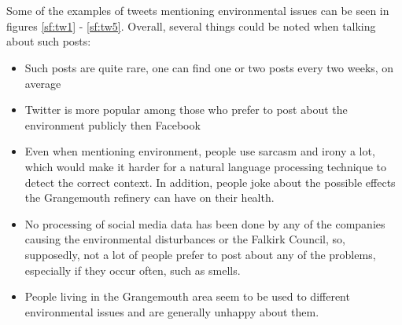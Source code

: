 \begin{figure}[t!]
\begin{minipage}{10cm}
 \end{minipage}
 \\ \vspace{0.1cm}
 \begin{minipage}{10cm}
     \centering
 \end{minipage}
 \\ \vspace{0.1cm}
 \begin{minipage}{10cm}
     \centering
 \end{minipage}
 \label{fig:multifigtweets}
 \end{figure}
 
 Some of the examples of tweets mentioning environmental issues can be seen in figures \ref{sf:tw1} - \ref{sf:tw5}. Overall, several things could be noted when talking about such posts:
 \begin{itemize}
     \item Such posts are quite rare, one can find one or two posts every two weeks, on average
     \item Twitter is more popular among those who prefer to post about the environment publicly then Facebook
     \item Even when mentioning environment, people use sarcasm and irony a lot, which would make it harder for a natural language processing technique to detect the correct context. In addition, people joke about the possible effects the Grangemouth refinery can have on their health.  
     \item No processing of social media data has been done by any of the companies causing the environmental disturbances or the Falkirk Council, so, supposedly, not a lot of people prefer to post about any of the problems, especially if they occur often, such as smells.
     \item People living in the Grangemouth area seem to be used to different environmental issues and are generally unhappy about them.
 \end{itemize}


